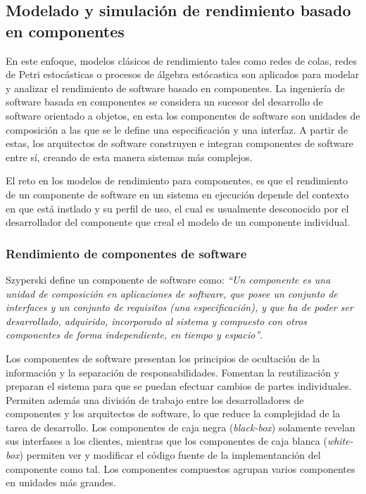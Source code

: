 \subsection{Modelado y simulación de rendimiento basado en componentes}
En este enfoque, modelos clásicos de rendimiento tales como redes de colas, redes de Petri estocásticas o procesos de álgebra estócastica son aplicados para modelar y analizar el rendimiento de software basado en componentes. La ingeniería de software basada en componentes se considera un sucesor del desarrollo de software orientado a objetos, en esta los componentes de software son unidades de composición a las que se le define una especificación y una interfaz. A partir de estas, los arquitectos de software construyen e integran componentes de software entre sí, creando de esta manera sistemas más complejos.\cite{Koziolek:2010:PEC:1808359.1808729}

El reto en los modelos de rendimiento para componentes, es que el rendimiento de un componente de software en un sistema en ejecución depende del contexto en que está instlado y su perfil de uso, el cual es usualmente desconocido por el desarrollador del componente que creal el modelo de un componente individual.

\subsubsection{Rendimiento de componentes de software}
Szyperski\cite{Szyperski:2002:CSB:515228} define un componente de software como: \textit{``Un componente es una unidad de composición en aplicaciones de software, que posee un conjunto de interfaces y un conjunto de requisitos (una especificación), y que ha de poder ser desarrollado, adquirido, incorporado al sistema y compuesto con otros componentes de forma independiente, en tiempo y espacio''}. 

Los componentes de software presentan los principios de ocultación de la información y la separación de responsabilidades. Fomentan la reutilización y preparan el sistema para que se puedan efectuar cambios de partes individuales. Permiten además una división de trabajo entre los desarrolladores de componentes y los arquitectos de software, lo que reduce la complejidad de la tarea de desarrollo. Los componentes de caja negra (\emph{black-box}) solamente revelan sus interfases a los clientes, mientras que los componentes de caja blanca (\emph{white-box}) permiten ver y modificar el código fuente de la implementanción del componente como tal. Los componentes compuestos agrupan varios componentes en unidades más grandes.

